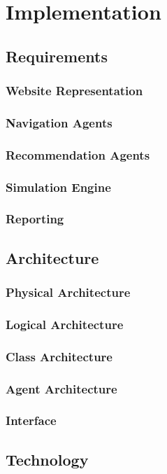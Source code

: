 \chapter{Implementation} \label{chap:implementation}

\section*{}

\section{Requirements}

\subsection{Website Representation}
\subsection{Navigation Agents}
\subsection{Recommendation Agents}
\subsection{Simulation Engine}
\subsection{Reporting}

\section{Architecture}

\subsection{Physical Architecture}
\subsection{Logical Architecture}
\subsection{Class Architecture}
\subsection{Agent Architecture}
\subsection{Interface}

\section{Technology}
